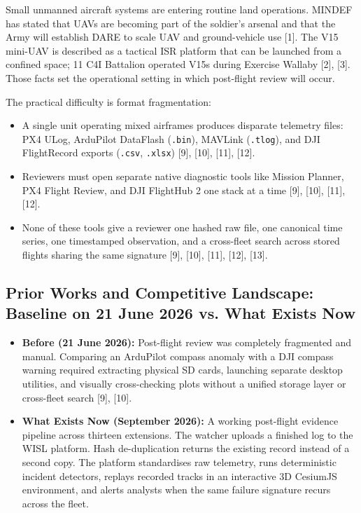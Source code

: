 \documentclass[11pt,a4paper]{article}
\newcommand{\code}[1]{\colorbox{codebg}{\small\texttt{\color{darkslate}#1}}}
\begin{document}
Small unmanned aircraft systems are entering routine land operations.
MINDEF has stated that UAVs are becoming part of the soldier's arsenal and that the Army will establish DARE to scale UAV and ground-vehicle use [1].
The V15 mini-UAV is described as a tactical ISR platform that can be launched from a confined space; 11 C4I Battalion operated V15s during Exercise Wallaby [2], [3].
Those facts set the operational setting in which post-flight review will occur.

The practical difficulty is format fragmentation:
\begin{itemize}
    \item A single unit operating mixed airframes produces disparate telemetry files: PX4 ULog, ArduPilot DataFlash (\code{.bin}), MAVLink (\code{.tlog}), and DJI FlightRecord exports (\code{.csv}, \code{.xlsx}) [9], [10], [11], [12].
    \item Reviewers must open separate native diagnostic tools like Mission Planner, PX4 Flight Review, and DJI FlightHub 2 one stack at a time [9], [10], [11], [12].
    \item None of these tools give a reviewer one hashed raw file, one canonical time series, one timestamped observation, and a cross-fleet search across stored flights sharing the same signature [9], [10], [11], [12], [13].
\end{itemize}

\subsection*{Prior Works and Competitive Landscape: Baseline on 21 June 2026 vs. What Exists Now}

\begin{itemize}
    \item \textbf{\color{accent}Before (21 June 2026):} Post-flight review was completely fragmented and manual. Comparing an ArduPilot compass anomaly with a DJI compass warning required extracting physical SD cards, launching separate desktop utilities, and visually cross-checking plots without a unified storage layer or cross-fleet search [9], [10].
    \item \textbf{\color{accent}What Exists Now (September 2026):} A working post-flight evidence pipeline across thirteen extensions. The watcher uploads a finished log to the WISL platform. Hash de-duplication returns the existing record instead of a second copy. The platform standardises raw telemetry, runs deterministic incident detectors, replays recorded tracks in an interactive 3D CesiumJS environment, and alerts analysts when the same failure signature recurs across the fleet.
\end{itemize}
\end{document}

